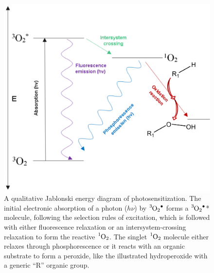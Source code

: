 \begin{figure}[t]
    \centering
    \includegraphics[width = \textwidth]{images/PDIpy/jablonski_diagram.png}
    \caption{
        A qualitative Jablonski energy diagram of photosensitization. The initial electronic absorption of a photon ($h\nu$) by $\ce{^3O2^.}$ forms a $\ce{^3O2^.}$* molecule, following the selection rules of excitation, which is followed with either fluorescence relaxation or an intersystem-crossing relaxation to form the reactive $\ce{^1O2}$. The singlet $\ce{^1O2}$ molecule either relaxes through phosphorescence or it reacts with an organic substrate to form a peroxide, like the illustrated hydroperoxide with a generic “R” organic group. 
    }
    \label{jablonski_diagram}
\end{figure}

